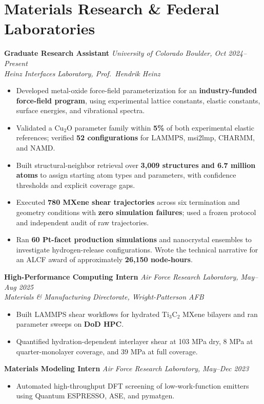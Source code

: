 \documentclass[letterpaper,10pt]{article}
\newcommand{\keep}{\needspace{4\baselineskip}}
\newcommand{\keepsection}{\needspace{6\baselineskip}}
\begin{document}
\keepsection\section*{Materials Research \& Federal Laboratories}
\textbf{Graduate Research Assistant} \hfill \textit{University of Colorado Boulder, Oct 2024--Present}\\
\textit{Heinz Interfaces Laboratory, Prof.\ Hendrik Heinz}
\begin{itemize}
    \item Developed metal-oxide force-field parameterization for an \textbf{industry-funded force-field program}, using experimental lattice constants, elastic constants, surface energies, and vibrational spectra.
    \item Validated a Cu\(_2\)O parameter family within \textbf{5\%} of both experimental elastic references; verified \textbf{52 configurations} for LAMMPS, msi2lmp, CHARMM, and NAMD.
    \item Built structural-neighbor retrieval over \textbf{3,009 structures and 6.7 million atoms} to assign starting atom types and parameters, with confidence thresholds and explicit coverage gaps.
    \item Executed \textbf{780 MXene shear trajectories} across six termination and geometry conditions with \textbf{zero simulation failures}; used a frozen protocol and independent audit of raw trajectories.
    \item Ran \textbf{60 Pt-facet production simulations} and nanocrystal ensembles to investigate hydrogen-release configurations. Wrote the technical narrative for an ALCF award of approximately \textbf{26,150 node-hours}.
\end{itemize}

\keep\textbf{High-Performance Computing Intern} \hfill \textit{Air Force Research Laboratory, May--Aug 2025}\\
\textit{Materials \& Manufacturing Directorate, Wright-Patterson AFB}
\begin{itemize}
    \item Built LAMMPS shear workflows for hydrated Ti\(_3\)C\(_2\) MXene bilayers and ran parameter sweeps on \textbf{DoD HPC}.
    \item Quantified hydration-dependent interlayer shear at 103 MPa dry, 8 MPa at quarter-monolayer coverage, and 39 MPa at full coverage.
\end{itemize}

\keep\textbf{Materials Modeling Intern} \hfill \textit{Air Force Research Laboratory, May--Dec 2023}
\begin{itemize}
    \item Automated high-throughput DFT screening of low-work-function emitters using Quantum ESPRESSO, ASE, and pymatgen.
\end{itemize}
\end{document}
